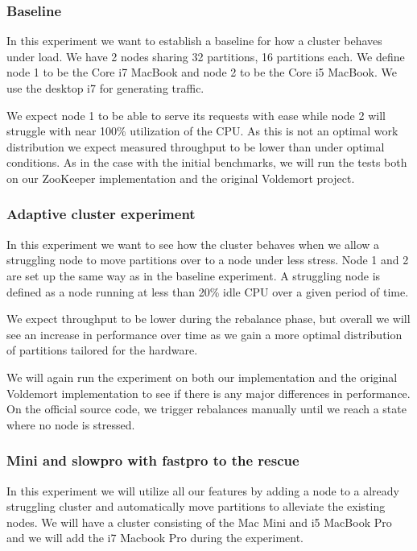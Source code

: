 \subsubsection{Baseline}
In this experiment we want to establish a baseline for how a cluster behaves under load. We have 2 nodes sharing 32 partitions, 16 partitions each. We define node 1 to be the Core i7 MacBook and node 2 to be the Core i5 MacBook. We use the desktop i7 for generating traffic. 

We expect node 1 to be able to serve its requests with ease while node 2 will struggle with near 100\% utilization of the CPU. As this is not an optimal work distribution we expect measured throughput to be lower than under optimal conditions. As in the case with the initial benchmarks, we will run the tests both on our ZooKeeper implementation and the original Voldemort project. 

\subsubsection{Adaptive cluster experiment}
In this experiment we want to see how the cluster behaves when we allow a struggling node to move partitions over to a node under less stress. Node 1 and 2 are set up the same way as in the baseline experiment. A struggling node is defined as a node running at less than 20\% idle CPU over a given period of time.

We expect throughput to be lower during the rebalance phase, but overall we will see an increase in performance over time as we gain a more optimal distribution of partitions tailored for the hardware. 

We will again run the experiment on both our implementation and the original Voldemort implementation to see if there is any major differences in performance. On the official source code, we trigger rebalances manually until we reach a state where no node is stressed. 



\subsubsection{Mini and slowpro with fastpro to the rescue}
In this experiment we will utilize all our features by adding a node to a already struggling cluster and automatically move partitions to alleviate the existing nodes. We will have a cluster consisting of the Mac Mini and i5 MacBook Pro and we will add the i7 Macbook Pro during the experiment. 


